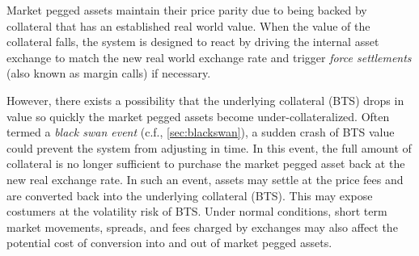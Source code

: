 Market pegged assets maintain their price parity due to being backed by
collateral that has an established real world value. When the value of the
collateral falls, the system is designed to react by driving the internal asset
exchange to match the new real world exchange rate and trigger \emph{force
settlements} (also known as margin calls) if necessary.

However, there exists a possibility that the underlying collateral (BTS) drops
in value so quickly the market pegged assets become under-collateralized. Often
termed a \emph{black swan event} (c.f., \cref{sec:blackswan}), a sudden crash
of BTS value could prevent the system from adjusting in time. In this event,
the full amount of collateral is no longer sufficient to purchase the market
pegged asset back at the new real exchange rate. In such an event, assets may
settle at the price fees and are converted back into the underlying collateral
(BTS). This may expose costumers at the volatility risk of BTS. Under normal
conditions, short term market movements, spreads, and fees charged by exchanges
may also affect the potential cost of conversion into and out of market pegged
assets.
